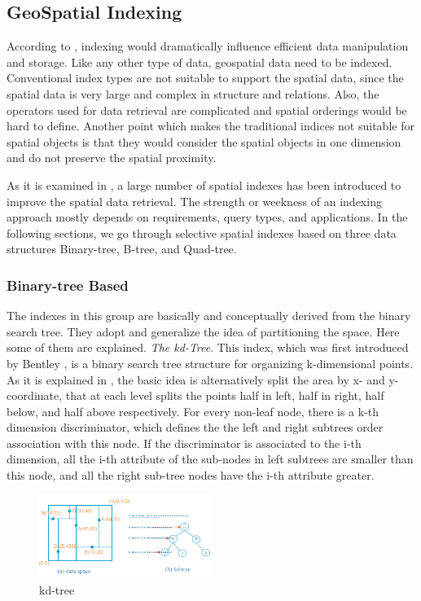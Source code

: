 \documentclass[a4paper,12pt]{article}
\begin{document}
\subsection{GeoSpatial Indexing}
\label{geospatialindex}
According to \cite{survey}, indexing would dramatically influence efficient data manipulation and storage. Like any other type of data, geospatial data need to be indexed. Conventional index types are not suitable to support the spatial data, since the spatial data is very large and complex in structure and relations. Also, the operators used for data retrieval are complicated and spatial orderings would be hard to define. Another point which makes the traditional indices not suitable for spatial objects is that they would consider the spatial objects in one dimension and do not preserve the spatial proximity.

As it is examined in \cite{survey}, a large number of spatial indexes has been introduced to improve the spatial data retrieval.
The strength or weekness of an indexing approach mostly depends on requirements, query types, and applications. In the following sections, we go through selective spatial indexes based on three data structures Binary-tree, B-tree, and Quad-tree.

\subsubsection{Binary-tree Based}
The indexes in this group are basically and conceptually derived from the binary search tree. They adopt and generalize the idea of partitioning the space. Here some of them are explained.
\emph{The kd-Tree}.
This index, which was first introduced by Bentley \cite{bently1975}, is a binary search tree structure for organizing k-dimensional points. As it is explained in \cite{bently1975}, the basic idea is alternatively split the area by x- and y-coordinate, that at each level splits the points half in left, half in right, half below, and half above respectively. For every non-leaf node, there is a k-th dimension discriminator, which defines the the left and right subtrees order association with this node. If the discriminator is associated to the i-th dimension, all the i-th attribute of the sub-nodes in left subtrees are smaller than this node, and all the right sub-tree nodes have the i-th attribute greater.

\begin{figure}
\centering
\includegraphics[width=0.5\textwidth]{kdtree}
\caption{kd-tree}
\label{figkdtree}
\end{figure}
\end{document}

